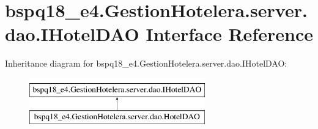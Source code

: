 \hypertarget{interfacebspq18__e4_1_1_gestion_hotelera_1_1server_1_1dao_1_1_i_hotel_d_a_o}{}\section{bspq18\+\_\+e4.\+Gestion\+Hotelera.\+server.\+dao.\+I\+Hotel\+D\+AO Interface Reference}
\label{interfacebspq18__e4_1_1_gestion_hotelera_1_1server_1_1dao_1_1_i_hotel_d_a_o}
Inheritance diagram for bspq18\+\_\+e4.\+Gestion\+Hotelera.\+server.\+dao.\+I\+Hotel\+D\+AO\+:\begin{figure}[H]
\begin{center}
\leavevmode
\includegraphics[height=2.000000cm]{interfacebspq18__e4_1_1_gestion_hotelera_1_1server_1_1dao_1_1_i_hotel_d_a_o}
\end{center}
\end{figure}
